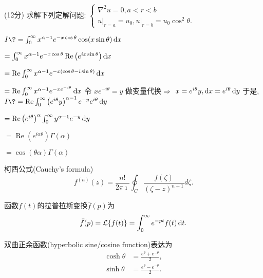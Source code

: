 \documentclass{njustexam}
\begin{document}
 \bigskip

\begin{problem}{(12分)}
  求解下列定解问题: 
  $\left\{\begin{array}{l}
    \nabla^2 u=0, a<r<b \\ 
    \left.u\right|_{r=a}=u_0,\left.u\right|_{r=b}=u_0 \cos ^2 \theta.
  \end{array}\right.$
\end{problem} 

\begin{solution}
 
  $ I\?=\int_0^{\infty} x^{\alpha-1} e^{-x \cos \theta} \cos (x \sin \theta) \dx$ \par
     \+ $=\int_0^{\infty} x^{\alpha-1} e^{-x \cos \theta} \operatorname{Re}\left(e^{i x \sin \theta}\right) \mathop{}\!\mathrm{d} x $ \par
     \+ $=\operatorname{Re} \int_0^{\infty} x^{\alpha-1} e^{-x(\cos \theta-i \sin \theta)} \mathop{}\!\mathrm{d} x$ \par
    \+ $=\operatorname{Re} \int_0^{\infty} x^{\alpha-1} e^{-x e^{-i \theta}} \mathop{}\!\mathrm{d} x$ 
   令 $x e^{-i \theta}=y$ 做变量代换$\Rightarrow$ $x=e^{i \theta} y, \mathop{}\!\mathrm{d} x=e^{i \theta} \mathop{}\!\mathrm{d} y$  \newline
   于是, $I \?=\operatorname{Re} \int_0^{\infty}\left(e^{i \theta} y\right)^{\alpha-1} e^{-y} e^{i \theta} \dy $ \par
         \+ $ =\operatorname{Re}\left(e^{i \theta}\right)^\alpha \int_0^{\infty} y^{\alpha-1} e^{-y} \mathop{}\!\mathrm{d} y $ \par
         \+ $ =\operatorname{Re}\left(e^{i \alpha \theta}\right) \Gamma(\alpha)$ \par
         \+ $ = \cos {(\theta \alpha)} \Gamma(\alpha)  $
\end{solution}

\newpage
{} %
柯西公式(Cauchy's formula)
\begin{equation*}
  f^{(n)}(z) = \frac{n!}{2\pi \imath} \oint_C \frac{f(\zeta)}{(\zeta - z)^{n+1}} d \zeta.
  \label{eq:cauchy_formula_nth_derivative}
\end{equation*}

函数$f(t)$的拉普拉斯变换$\bar{f}(p)$为
\begin{equation*}
    \bar{f}(p) = \mathcal{L} \{ f(t) \} = \int_0 ^{\infty} e^{-pt} f(t) \mathop{}\!\mathrm{d} t .
\end{equation*}

双曲正余函数(hyperbolic sine/cosine function)表达为
\begin{align*}
    \cosh \theta &= \frac{e^{\theta} + e^{ - \theta} }{2} ,
    \\
    \sinh \theta &= \frac{e^{\theta} - e^{ - \theta} }{2} .
\end{align*}
\end{document}
